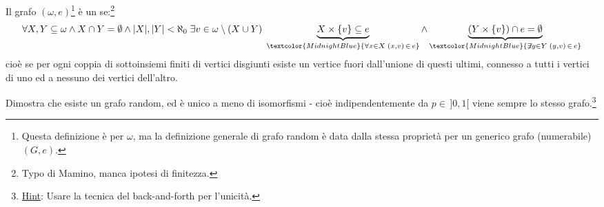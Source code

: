\begin{definition}
	Il grafo $(\omega,e)$\footnote{Questa definizione è per $\omega$, ma la definizione generale di grafo random è data dalla stessa proprietà per un generico grafo (numerabile) $(G,e)$.} è un  se:\footnote{Typo di Mamino, manca ipotesi di finitezza.}
	\[ \forall X,Y \subseteq \omega \land  X \cap Y = \emptyset \land |X|,|Y|<\aleph_0\; \exists v \in \omega \setminus(X \cup Y) \; \underbrace{X \times \{v\} \subseteq e}_{\textcolor{MidnightBlue}{\forall x\in X \; (x,v) \,\in\, e}} \land \underbrace{(Y \times \{v\}) \cap e = \emptyset}_{\textcolor{MidnightBlue}{\not\exists y \in Y \; (y,v) \,\in\, e}}
		\]
	cioè se per ogni coppia di sottoinsiemi finiti di vertici disgiunti esiste un vertice fuori dall'unione di questi ultimi, connesso a tutti i vertici di uno ed a nessuno dei vertici dell'altro.
\end{definition}

\begin{exercise}
	Dimostra che esiste un grafo random, ed è unico a meno di isomorfismi - cioè indipendentemente da $p \in \, ]0,1[$ viene sempre lo stesso grafo.\footnote{\underline{Hint}: Usare la tecnica del back-and-forth per l'unicità.}
\end{exercise}

